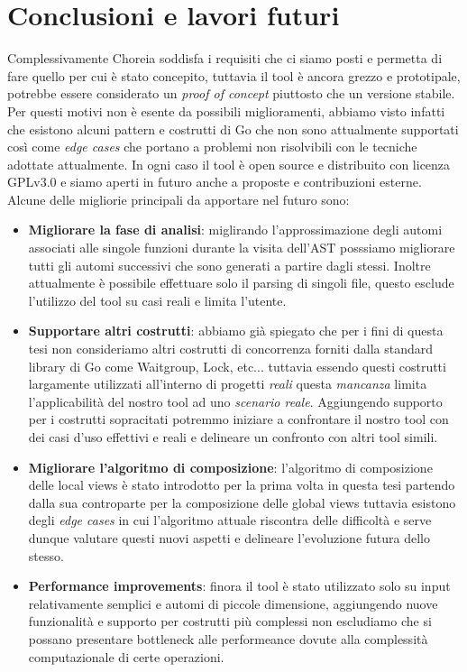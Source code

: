 \chapter{Conclusioni e lavori futuri}
Complessivamente Choreia soddisfa i requisiti che ci siamo posti e permetta di fare quello per cui è stato concepito, tuttavia il tool è ancora grezzo e prototipale, potrebbe essere considerato un \emph{proof of concept} piuttosto che un versione stabile. Per questi motivi non è esente da possibili miglioramenti, abbiamo visto infatti che esistono alcuni pattern e costrutti di Go che non sono attualmente supportati così come \emph{edge cases} che portano a problemi non risolvibili con le tecniche adottate attualmente. In ogni caso il tool è open source e distribuito con licenza GPLv3.0 e siamo aperti in futuro anche a proposte e contribuzioni esterne.\bigskip \\
Alcune delle migliorie principali da apportare nel futuro sono:
\begin{itemize}
    \item \textbf{Migliorare la fase di analisi}: miglirando l'approssimazione degli automi associati alle singole funzioni durante la visita dell'AST posssiamo migliorare tutti gli automi successivi che sono generati a partire dagli stessi. Inoltre attualmente è possibile effettuare solo il parsing di singoli file, questo esclude l'utilizzo del tool su casi reali e limita l'utente.
    \item \textbf{Supportare altri costrutti}: abbiamo già spiegato che per i fini di questa tesi non consideriamo altri costrutti di concorrenza forniti dalla standard library di Go come Waitgroup, Lock, etc... tuttavia essendo questi costrutti largamente utilizzati all'interno di progetti \emph{reali} questa \emph{mancanza} limita l'applicabilità del nostro tool ad uno \emph{scenario reale}. Aggiungendo supporto per i costrutti sopracitati potremmo iniziare a confrontare il nostro tool con dei casi d'uso effettivi e reali e delineare un confronto con altri tool simili.
    \item \textbf{Migliorare l'algoritmo di composizione}: l'algoritmo di composizione delle local views è stato introdotto per la prima volta in questa tesi partendo dalla sua controparte per la composizione delle global views tuttavia esistono degli \emph{edge cases} in cui l'algoritmo attuale riscontra delle difficoltà e serve dunque valutare questi nuovi aspetti e delineare l'evoluzione futura dello stesso.
    \item \textbf{Performance improvements}: finora il tool è stato utilizzato solo su input relativamente semplici e automi di piccole dimensione, aggiungendo nuove funzionalità e supporto per costrutti più complessi non escludiamo che si possano presentare bottleneck alle performeance dovute alla complessità computazionale di certe operazioni.
\end{itemize}
